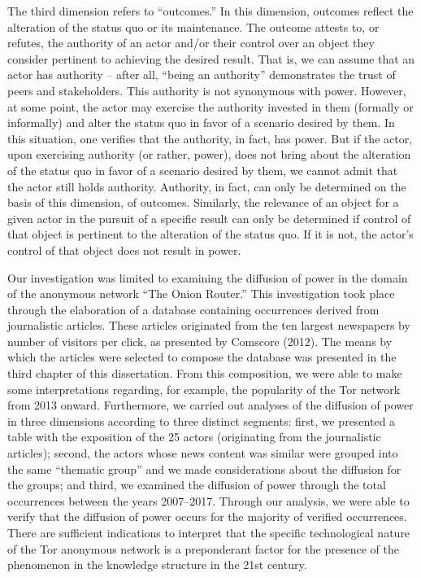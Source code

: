 The third dimension refers to ``outcomes.'' In this dimension, outcomes reflect the alteration of the status quo or its maintenance. The outcome attests to, or refutes, the authority of an actor and/or their control over an object they consider pertinent to achieving the desired result. That is, we can assume that an actor has authority -- after all, ``being an authority'' demonstrates the trust of peers and stakeholders. This authority is not synonymous with power. However, at some point, the actor may exercise the authority invested in them (formally or informally) and alter the status quo in favor of a scenario desired by them. In this situation, one verifies that the authority, in fact, has power. But if the actor, upon exercising authority (or rather, power), does not bring about the alteration of the status quo in favor of a scenario desired by them, we cannot admit that the actor still holds authority. Authority, in fact, can only be determined on the basis of this dimension, of outcomes. Similarly, the relevance of an object for a given actor in the pursuit of a specific result can only be determined if control of that object is pertinent to the alteration of the status quo. If it is not, the actor's control of that object does not result in power.

Our investigation was limited to examining the diffusion of power in the domain of the anonymous network ``The Onion Router.'' This investigation took place through the elaboration of a database containing occurrences derived from journalistic articles. These articles originated from the ten largest newspapers by number of visitors per click, as presented by Comscore (2012). The means by which the articles were selected to compose the database was presented in the third chapter of this dissertation. From this composition, we were able to make some interpretations regarding, for example, the popularity of the Tor network from 2013 onward. Furthermore, we carried out analyses of the diffusion of power in three dimensions according to three distinct segments: first, we presented a table with the exposition of the 25 actors (originating from the journalistic articles); second, the actors whose news content was similar were grouped into the same ``thematic group'' and we made considerations about the diffusion for the groups; and third, we examined the diffusion of power through the total occurrences between the years 2007--2017. Through our analysis, we were able to verify that the diffusion of power occurs for the majority of verified occurrences. There are sufficient indications to interpret that the specific technological nature of the Tor anonymous network is a preponderant factor for the presence of the phenomenon in the knowledge structure in the 21st century.

